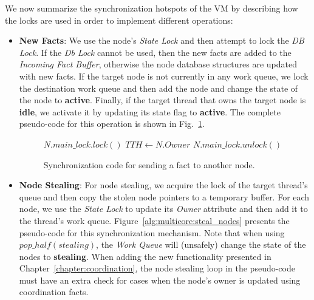 
We now summarize the synchronization hotspots of the VM by describing how the locks
are used in order to implement different operations:

\begin{itemize}

   \item \textbf{New Facts}: We use the node's \emph{State Lock} and then attempt
      to lock the \emph{DB Lock}. If the \emph{Db Lock} cannot be used, then the
      new facts are added to the \emph{Incoming Fact Buffer}, otherwise the node database
      structures are updated with new facts. If the target node is not currently
      in any work queue, we lock the destination work queue and then add the
      node and change the state of the node to \textbf{active}. Finally, if the
      target thread that owns the target node is \textbf{idle}, we activate it
      by updating its state flag to \textbf{active}. The complete pseudo-code
      for this operation is shown in Fig.~\ref{alg:multicore:new_fact}.

\begin{figure}
\begin{algorithm}[H]
   $N.main\_lock.lock()$\;
   $TTH \longleftarrow N.Owner$\;
   $N.main\_lock.unlock()$\;
\end{algorithm}
\caption{Synchronization code for sending a fact to another node.}
 \label{alg:multicore:new_fact}
\end{figure}


   \item \textbf{Node Stealing}: For node stealing, we acquire the lock of the
      target thread's queue and then copy the stolen node pointers to a
      temporary buffer. For each node, we use the \emph{State Lock} to update its
      \emph{Owner} attribute and then add it to the thread's work queue.
      Figure~\ref{alg:multicore:steal_nodes} presents the pseudo-code for this
      synchronization mechanism. Note that when using $pop\_half(stealing)$, the
      \emph{Work Queue} will (unsafely) change the state of the nodes to
      \textbf{stealing}. When adding the new functionality presented in
      Chapter~\ref{chapter:coordination}, the node stealing loop in the
      pseudo-code must have an extra check for cases when the node's owner
      is updated using coordination facts.


\end{itemize}
